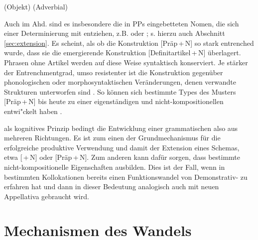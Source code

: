 \begin{exe}
	\ex \label{ex:fuss}
	\begin{xlist}
		\ex \label{ex:denfuss}  (Objekt)  
		\ex \label{ex:zufuss}  (Adverbial) 
	\end{xlist}
\end{exe}

Auch im Ahd. sind es insbesondere die in PPs eingebetteten Nomen, die sich einer Determinierung mit  entziehen, z.B.   oder   \parencite[84]{Oubouzar1992}; s. hierzu auch Abschnitt \ref{sec:extension}. Es scheint, als ob die Konstruktion   [Präp\,+\,N] so stark entrenched wurde, dass sie die emergierende Konstruktion  [Definitartikel\,+\,N] überlagert. Phrasen ohne Artikel werden auf diese Weise syntaktisch konserviert. Je stärker der Entrenchmentgrad,  umso resistenter ist die Konstruktion   gegenüber phonologischen oder morphosyntaktischen Veränderungen, denen verwandte Strukturen unterworfen sind \parencite[715]{Bybee2006}. So können sich bestimmte Types des Musters [Präp\,+\,N] bis heute zu einer eigenständigen und nicht-kompositionellen   entwi"ckelt haben \parencite[343--344]{Himmelmann1998}. 

 als kognitives Prinzip bedingt die Entwicklung einer grammatischen   also aus mehreren Richtungen. Es ist zum einen der Grundmechanismus für die erfolgreiche produktive Verwendung und damit der Extension eines Schemas, etwa [\,+\,N] oder [Präp\,+\,N]. Zum anderen kann  dafür sorgen, dass bestimmte  nicht-kompositionelle Eigenschaften  ausbilden. Dies ist der Fall, wenn  in bestimmten Kollokationen bereits einen Funktionswandel von Demonstrativ-  zu  erfahren hat und dann in dieser Bedeutung analogisch  auch mit neuen Appellativa  gebraucht wird. 


\section{Mechanismen des Wandels}\label{sec:mechanismen}

